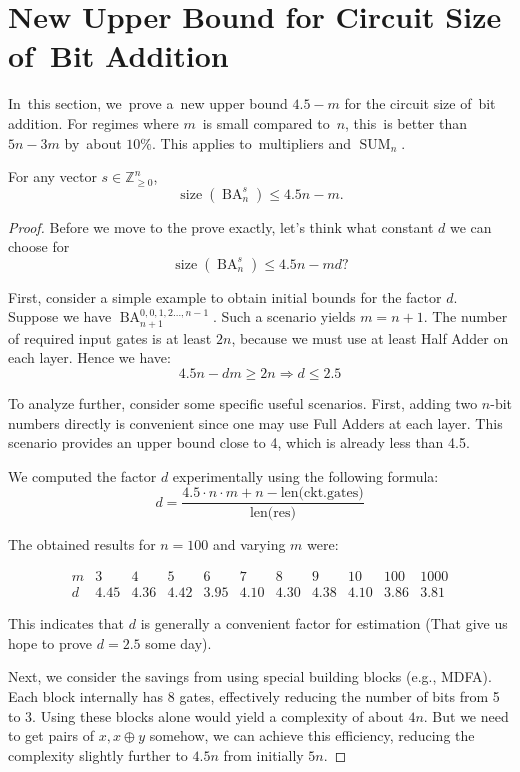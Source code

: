\documentclass[sigconf, review, anonymous]{acmart}
\DeclareMathOperator{\SUM}{SUM}
\DeclareMathOperator{\BA}{BA}
\begin{document}
\section{New Upper Bound for Circuit Size of~Bit Addition}
In~this section, we~prove a~new upper bound $4.5-m$ for the circuit size
of~bit addition. For regimes where $m$~is small compared to~$n$, this~is
better than $5n-3m$ by~about $10\%$. This applies to~multipliers and $\SUM_n$.
\begin{theorem}
    For any vector $s \in \mathbb{Z}_{\ge 0}^n$,
    \[\operatorname{size}(\BA_n^s) \le 4.5n-m.\]
\end{theorem}
\begin{proof}
Before we move to the prove exactly, let's think what constant \(d\) we can choose for
    \[\operatorname{size}(\BA_n^s) \le 4.5n-md?\]

First, consider a simple example to obtain initial bounds for the factor \( d \). Suppose we have $\BA^{0,0,1,2\dotsc,n - 1}_{n + 1}$. Such a scenario yields \( m = n + 1 \). The number of required input gates is at least \( 2n \), because we must use at least Half Adder on each layer. Hence we have:
\[
4.5n - d m \geq 2n \Rightarrow d \leq 2.5
\]

To analyze further, consider some specific useful scenarios. First, adding two \( n \)-bit numbers directly is convenient since one may use Full Adders at each layer. This scenario provides an upper bound close to 4, which is already less than 4.5.

We computed the factor \( d \) experimentally using the following formula:
\[
d = \frac{4.5 \cdot n \cdot m + n - \text{len(ckt.gates)}}{\text{len(res)}}
\]

The obtained results for \( n = 100 \) and varying \( m \) were:

\[
\begin{array}{c|cccccccccc}
m & 3 & 4 & 5 & 6 & 7 & 8 & 9 & 10 & 100 & 1000 \\
\hline
d & 4.45 & 4.36 & 4.42 & 3.95 & 4.10 & 4.30 & 4.38 & 4.10 & 3.86 & 3.81
\end{array}
\]

This indicates that \( d \) is generally a convenient factor for estimation (That give us hope to prove \(d = 2.5\) some day).

Next, we consider the savings from using special building blocks (e.g., MDFA). Each block internally has 8 gates, effectively reducing the number of bits from 5 to 3. Using these blocks alone would yield a complexity of about \(4n\). But we need to get pairs of \(x, x \oplus y \) somehow, we can achieve this efficiency, reducing the complexity slightly further to \(4.5n\) from initially \(5n\).


\end{proof}
\end{document}
